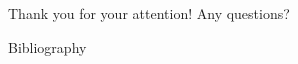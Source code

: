 \documentclass{beamer}
\begin{document}

\begin{frame}
	Thank you for your attention!
    \newline
    \textcolor{mDarkYellow}{Any questions?}
\end{frame}



\begin{frame}[allowframebreaks]{Bibliography}
\begin{tiny}
   \nocite{*}
    
    
\end{tiny}
\end{frame}
\end{document}
